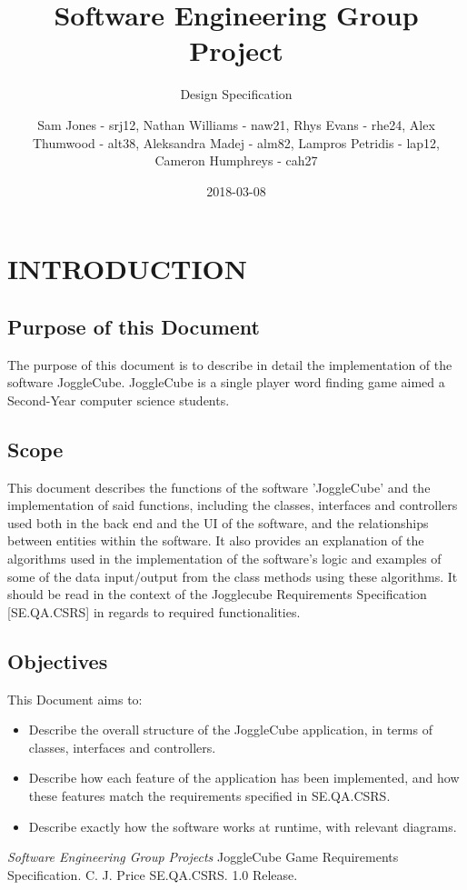 \documentclass{project}
\title{Software Engineering Group Project}
\subtitle{Design Specification}
\author{
	Sam Jones - srj12, \newline
	Nathan Williams - naw21, \newline
    Rhys Evans - rhe24, \newline
    Alex Thumwood - alt38, \newline
    Aleksandra Madej - alm82, \newline
    Lampros Petridis - lap12, \newline
    Cameron Humphreys - cah27
}
\date{2018-03-08}
\begin{document}
	
	\maketitle
	\tableofcontents
	\clearpage
	\section{INTRODUCTION} %
		\subsection{Purpose of this Document}
        The purpose of this document is to describe in detail the implementation of the software JoggleCube. JoggleCube is a single player word finding game aimed a Second-Year computer science students. 
		\subsection{Scope}
        	This document describes the functions of the software 'JoggleCube' and the implementation of said functions, including the classes, interfaces and controllers used both in the back end and the UI of the software, and the relationships between entities within the software. It also provides an explanation of the algorithms used in the implementation of the software's logic and examples of some of the data input/output from the class methods using these algorithms. It should be read in the context of the Jogglecube Requirements Specification [SE.QA.CSRS] in regards to required functionalities. 
     
		\subsection{Objectives}
			This Document aims to:
			\begin{itemize}
				\item  Describe the overall structure of the JoggleCube application, in terms of classes, interfaces and controllers.
                \item Describe how each feature of the application has been implemented, and how these features match the requirements specified in SE.QA.CSRS.
                \item Describe exactly how the software works at runtime, with relevant diagrams. 
                
			\end{itemize}
	\begin{thebibliography}{5}
		 \emph{Software Engineering Group Projects}
JoggleCube Game Requirements Specification.
C. J. Price SE.QA.CSRS. 1.0 Release.
	\end{thebibliography}
	\clearpage
\end{document}
